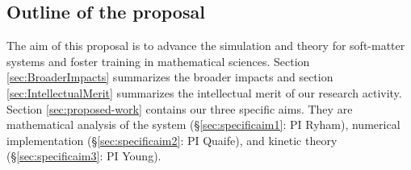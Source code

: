 \subsection{Outline of the proposal}
The aim of this proposal is to advance the simulation
and theory for soft-matter systems
and foster training in mathematical sciences.
Section \ref{sec:BroaderImpacts} summarizes the broader
impacts and section \ref{sec:IntellectualMerit} summarizes the intellectual merit of our research activity.
Section \ref{sec:proposed-work} contains our
three specific aims.  They are
mathematical analysis of the system
(\S \ref{sec:specificaim1}: PI Ryham),
numerical implementation
(\S \ref{sec:specificaim2}: PI Quaife),
and  kinetic theory
(\S \ref{sec:specificaim3}: PI Young).



